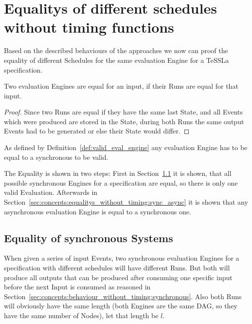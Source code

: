 \section{Equalitys of different schedules without timing functions}
\label{sec:concepts:equalitys_without_timing}

Based on the described behaviours of the approaches we now can proof the equality of different Schedules for the same evaluation Engine for a TeSSLa specification.

\begin{lemma}[name = Equality of Engines for one Input]\label{lemma:eval_equal_if_runs_equal}
  Two evaluation Engines are equal for an input, if their Runs are equal for that input.
\end{lemma}

\begin{proof}
  Since two Runs are equal if they have the same last State, and all Events which were produced are stored in the State, during both Runs the same output Events had to be generated or else their State would differ.
\end{proof}



As defined by Definition~\ref{def:valid_eval_engine} any evaluation Engine has to be equal to a synchronous to be valid.

The Equality is shown in two steps: First in Section~\ref{sec:concepts:equalitys_without_timing:synchronous} it is shown, that all possible synchronous Engines for a specification are equal, so there is only one valid Evaluation.
Afterwards in Section~\ref{sec:concepts:equalitys_without_timing:sync_async} it is shown that any asynchronous evaluation Engine is equal to a synchronous one.


\subsection{Equality of synchronous Systems}
\label{sec:concepts:equalitys_without_timing:synchronous}

When given a series of input Events, two synchronous evaluation Engines for a specification with different schedules will have different Runs.
But both will produce all outputs that can be produced after consuming one specific input before the next Input is consumed as reasoned in Section~\ref{sec:concepts:behaviour_without_timing:synchronous}.
Also both Runs will obviously have the same length (both Engines are the same DAG, so they have the same number of Nodes), let that length be \(l\).

